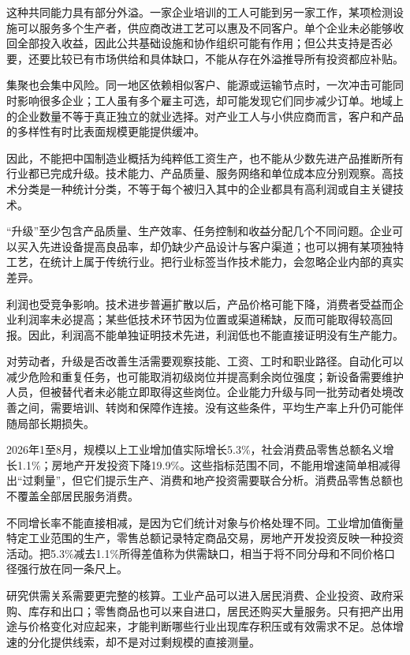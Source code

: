 \documentclass[UTF8,fontset=fandol,zihao=-4,oneside,openany]{ctexbook}
\begin{document}
这种共同能力具有部分外溢。一家企业培训的工人可能到另一家工作，某项检测设施可以服务多个生产者，供应商改进工艺可以惠及不同客户。单个企业未必能够收回全部投入收益，因此公共基础设施和协作组织可能有作用；但公共支持是否必要，还要比较已有市场供给和具体缺口，不能从存在外溢推导所有投资都应补贴。

集聚也会集中风险。同一地区依赖相似客户、能源或运输节点时，一次冲击可能同时影响很多企业；工人虽有多个雇主可选，却可能发现它们同步减少订单。地域上的企业数量不等于真正独立的就业选择。对产业工人与小供应商而言，客户和产品的多样性有时比表面规模更能提供缓冲。

因此，不能把中国制造业概括为纯粹低工资生产，也不能从少数先进产品推断所有行业都已完成升级。技术能力、产品质量、服务网络和单位成本应分别观察。高技术分类是一种统计分类，不等于每个被归入其中的企业都具有高利润或自主关键技术。

\label{arg:P203}
“升级”至少包含产品质量、生产效率、任务控制和收益分配几个不同问题。企业可以买入先进设备提高良品率，却仍缺少产品设计与客户渠道；也可以拥有某项独特工艺，在统计上属于传统行业。把行业标签当作技术能力，会忽略企业内部的真实差异。

利润也受竞争影响。技术进步普遍扩散以后，产品价格可能下降，消费者受益而企业利润率未必提高；某些低技术环节因为位置或渠道稀缺，反而可能取得较高回报。因此，利润高不能单独证明技术先进，利润低也不能直接证明没有生产能力。

对劳动者，升级是否改善生活需要观察技能、工资、工时和职业路径。自动化可以减少危险和重复任务，也可能取消初级岗位并提高剩余岗位强度；新设备需要维护人员，但被替代者未必能立即取得这些岗位。企业能力升级与同一批劳动者处境改善之间，需要培训、转岗和保障作连接。没有这些条件，平均生产率上升仍可能伴随局部长期损失。

2026年1至8月，规模以上工业增加值实际增长5.3\%，社会消费品零售总额名义增长1.1\%；房地产开发投资下降19.9\%。这些指标范围不同，不能用增速简单相减得出“过剩量”，但它们提示生产、消费和地产投资需要联合分析。消费品零售总额也不覆盖全部居民服务消费。\cite{Current2026}

\label{arg:P204}
不同增长率不能直接相减，是因为它们统计对象与价格处理不同。工业增加值衡量特定工业范围的生产，零售总额记录特定商品交易，房地产开发投资反映一种投资活动。把5.3\%减去1.1\%所得差值称为供需缺口，相当于将不同分母和不同价格口径强行放在同一条尺上。\cite{Current2026}

研究供需关系需要更完整的核算。工业产品可以进入居民消费、企业投资、政府采购、库存和出口；零售商品也可以来自进口，居民还购买大量服务。只有把产出用途与价格变化对应起来，才能判断哪些行业出现库存积压或有效需求不足。总体增速的分化提供线索，却不是对过剩规模的直接测量。
\end{document}
